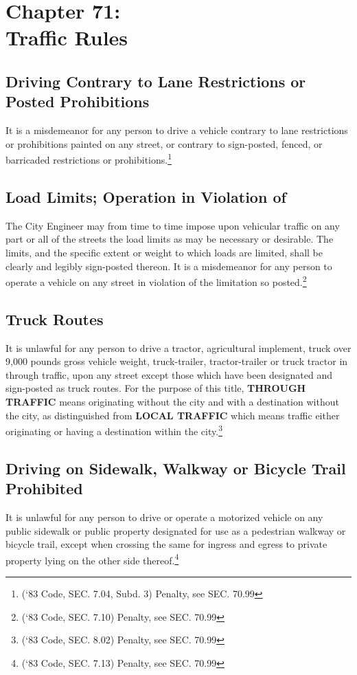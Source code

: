 \chapter*{Chapter 71: \\
	Traffic Rules}
    \minitoc
    \pagebreak


\section{Driving Contrary to Lane Restrictions or Posted Prohibitions}
It is a misdemeanor for any person to drive a vehicle contrary to lane restrictions or prohibitions painted on any street, or contrary to sign-posted, fenced, or barricaded restrictions or prohibitions.\footnote{(‘83 Code, SEC. 7.04, Subd. 3) Penalty, see SEC. 70.99}
\section{Load Limits; Operation in Violation of}
The City Engineer may from time to time impose upon vehicular traffic on any part or all of the streets the load limits as may be necessary or desirable. The limits, and the specific extent or weight to which loads are limited, shall be clearly and legibly sign-posted thereon. It is a misdemeanor for any person to operate a vehicle on any street in violation of the limitation so posted.\footnote{(‘83 Code, SEC. 7.10) Penalty, see SEC. 70.99}
\section{Truck Routes}
It is unlawful for any person to drive a tractor, agricultural implement, truck over 9,000 pounds gross vehicle weight, truck-trailer, tractor-trailer or truck tractor in through traffic, upon any street except those which have been designated and sign-posted as truck routes.  For the purpose of this title, \textbf{THROUGH TRAFFIC} means originating without the city and with a destination without the city, as distinguished from \textbf{LOCAL TRAFFIC} which means traffic either originating or having a destination within the city.\footnote{(‘83 Code, SEC. 8.02) Penalty, see SEC. 70.99}

\section{Driving on Sidewalk, Walkway or Bicycle Trail Prohibited}
It is unlawful for any person to drive or operate a motorized vehicle on any public sidewalk or public property designated for use as a pedestrian walkway or bicycle trail, except when crossing the same for ingress and egress to private property lying on the other side thereof.\footnote{(‘83 Code, SEC. 7.13) Penalty, see SEC. 70.99}
